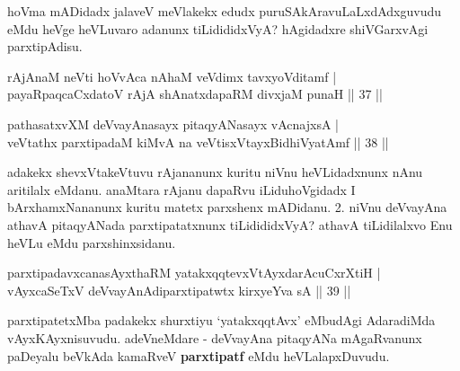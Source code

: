 \begin{artha}
hoVma mADidadx jalaveV meVlakekx edudx puruSAkAravuLaLxdAdxguvudu eMdu heVge heVLuvaro adanunx tiLidididxVyA? hAgidadxre shiVGarxvAgi parxtipAdisu.
\end{artha}

\begin{shl}
rAjAnaM neVti hoVvAca nAhaM veVdimx tavxyoVditamf | \\
payaRpaqcaCxdatoV rAjA shAnatxdapaRM divxjaM punaH \hfill|| 37 || 
\end{shl}

\begin{shl}
pathasatxvXM deVvayAnasayx pitaqyANasayx vA\s cnajxsA | \\
veVtathx parxtipadaM kiMvA na veVtisxVtayxBidhiVyatAmf \hfill|| 38 || 
\end{shl}

\begin{artha}
adakekx shevxVtakeVtuvu rAjananunx kuritu niVnu heVLidadxnunx nAnu 
aritilalx eMdanu. anaMtara rAjanu dapaRvu iLiduhoVgidadx I 
bArxhamxNananunx kuritu matetx parxshenx mADidanu. 2. niVnu deVvayAna 
athavA pitaqyANada parxtipatatxnunx tiLidididxVyA? athavA tiLidilalxvo 
Enu heVLu eMdu parxshinxsidanu.
\end{artha}


\begin{shl}
parxtipadavxcanasAyxthaRM \footnotemark[1]yatakxqqtevxVtAyxdarAcuCxrXtiH | \\
vAyxcaSeTxV deVvayAnAdiparxtipatwtx \footnotemark[2]kirxyeYva sA \hfill|| 39 || 
\end{shl}
\footnotetext[2]{}

\begin{artha}
parxtipatetxMba padakekx shurxtiyu `yatakxqqtAvx' eMbudAgi AdaradiMda 
vAyxKAyxnisuvudu. adeVneMdare - deVvayAna pitaqyANa mAgaRvanunx 
paDeyalu beVkAda kamaRveV \textbf{parxtipatf} eMdu heVLalapxDuvudu.
\end{artha}


